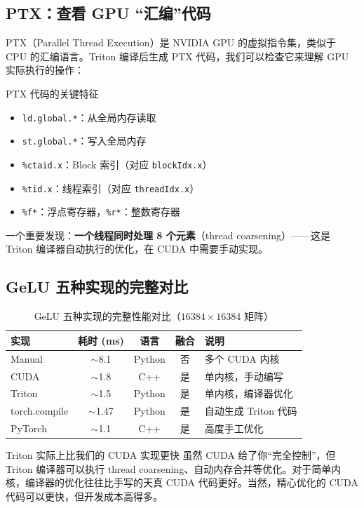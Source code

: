 \documentclass[a4paper]{article}
\begin{document}
\subsection{PTX：查看 GPU ``汇编''代码}

PTX（Parallel Thread Execution）是 NVIDIA GPU 的虚拟指令集，类似于 CPU 的汇编语言。Triton 编译后生成 PTX 代码，我们可以检查它来理解 GPU 实际执行的操作：

\begin{knowledgebox}{PTX 代码的关键特征}
\begin{itemize}
    \item \texttt{ld.global.*}：从全局内存读取
    \item \texttt{st.global.*}：写入全局内存
    \item \texttt{\%ctaid.x}：Block 索引（对应 \texttt{blockIdx.x}）
    \item \texttt{\%tid.x}：线程索引（对应 \texttt{threadIdx.x}）
    \item \texttt{\%f*}：浮点寄存器，\texttt{\%r*}：整数寄存器
\end{itemize}
一个重要发现：\textbf{一个线程同时处理 8 个元素}（thread coarsening）——这是 Triton 编译器自动执行的优化，在 CUDA 中需要手动实现。
\end{knowledgebox}

\subsection{GeLU 五种实现的完整对比}

\begin{table}[H]
\centering
\begin{tabular}{lcccl}
\toprule
\textbf{实现} & \textbf{耗时 (ms)} & \textbf{语言} & \textbf{融合} & \textbf{说明} \\
\midrule
Manual & $\sim$8.1 & Python & 否 & 多个 CUDA 内核 \\
CUDA & $\sim$1.8 & C++ & 是 & 单内核，手动编写 \\
Triton & $\sim$1.5 & Python & 是 & 单内核，编译器优化 \\
torch.compile & $\sim$1.47 & Python & 是 & 自动生成 Triton 代码 \\
PyTorch & $\sim$1.1 & C++ & 是 & 高度手工优化 \\
\bottomrule
\end{tabular}
\caption{GeLU 五种实现的完整性能对比（$16384 \times 16384$ 矩阵）}
\end{table}

\begin{knowledgebox}{Triton 实际上比我们的 CUDA 实现更快}
虽然 CUDA 给了你``完全控制''，但 Triton 编译器可以执行 thread coarsening、自动内存合并等优化。对于简单内核，编译器的优化往往比手写的天真 CUDA 代码更好。当然，精心优化的 CUDA 代码可以更快，但开发成本高得多。
\end{knowledgebox}
\end{document}
